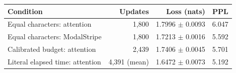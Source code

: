 \begin{tabular}{lrrr}\toprule
Condition & Updates & Loss (nats) & PPL\\\midrule
Equal characters: attention & 1,800 & 1.7996 $\pm$ 0.0093 & 6.047 \\
Equal characters: ModalStripe & 1,800 & 1.7213 $\pm$ 0.0016 & 5.592 \\
Calibrated budget: attention & 2,439 & 1.7406 $\pm$ 0.0045 & 5.701 \\
Literal elapsed time: attention & 4,391 (mean) & 1.6472 $\pm$ 0.0073 & 5.192 \\
\bottomrule\end{tabular}
